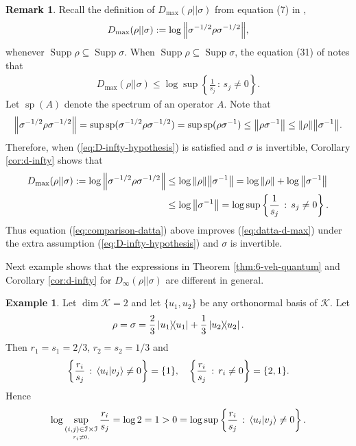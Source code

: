 \documentclass[12pt,a4paper,oneside]{article}
\numberwithin{equation}{section}
\theoremstyle{definition}  %
\newtheorem{eg}[defn]{Example}
\newtheorem{rmk}[defn]{Remark}
\theoremstyle{plain}  %
\theoremstyle{remark} %
\newcommand{\CK}{\mathcal{K}}
\DeclareMathOperator{\supp}{Supp}
\begin{document}
 \begin{rmk}\label{rmk:camparison-datta}Recall the definition of $D_{\operatorname{max}}(\rho||\sigma)$ from equation (7) in \cite{Datta2009},   \begin{align*}
     D_{\operatorname{max}}(\rho||\sigma):= \log \norm{\sigma^{-1/2}\rho\sigma^{-1/2}},
 \end{align*}
 whenever $\supp\rho \subseteq\supp \sigma$. When $\supp \rho \subseteq \supp \sigma$, the  equation (31) of \cite{Datta2009} notes that \begin{align}
     \label{eq:datta-d-max}
     D_{\operatorname{max}}(\rho||\sigma) \leq \log \sup\left\{\frac{1}{s_j}\,:\, s_j\neq 0\right\}.
 \end{align}
Let $\operatorname{sp}(A)$ denote the spectrum of an operator $A$.  Note that \[\norm{\sigma^{-1/2}\rho\sigma^{-1/2}}=\sup \operatorname{sp}(\sigma^{-1/2}\rho\sigma^{-1/2})=\sup \operatorname{sp}(\rho\sigma^{-1})\leq\norm{\rho\sigma^{-1}}\leq \norm{\rho} \norm{\sigma^{-1}}.\]
Therefore, when (\ref{eq:D-infty-hypothesis}) is satisfied and $\sigma$ is invertible, Corollary \ref{cor:d-infty} shows that \begin{align}\label{eq:comparison-datta}
     D_{\operatorname{max}}(\rho||\sigma):= \log \norm{\sigma^{-1/2}\rho\sigma^{-1/2}}&\leq \log \norm{\rho} \norm{\sigma^{-1}} = \log \norm{\rho}+\log \norm{\sigma^{-1}}\nonumber\\&\leq \log \norm{\sigma^{-1}}  = \log\sup\left\{\frac{1}{s_j}\,:\, s_j\neq 0\right\}.
\end{align} Thus equation (\ref{eq:comparison-datta}) above improves  (\ref{eq:datta-d-max}) under the extra assumption (\ref{eq:D-infty-hypothesis}) and $\sigma$ is invertible.
 \end{rmk}
 Next example shows that the expressions in Theorem \ref{thm:6-veh-quantum} and Corollary \ref{cor:d-infty} for $D_{\infty}(\rho||\sigma)$ are different in general.
 \begin{eg}
   Let $\dim \CK  = 2$ and let $\{u_1,u_2\}$ be any orthonormal basis of $\CK $. Let \begin{align*}
       \rho = \sigma =  \frac{2}{3}\ketbra{u_1}+\frac{1}{3}\ketbra{u_2}.
   \end{align*}  
   Then $r_1=s_1=2/3$, $r_2=s_2=1/3$ and \[\left\{\frac{r_i}{s_j}\,:\,\braket{u_i}{v_j}\neq 0\right\}  =\{1\}, \quad \left\{\frac{r_i}{s_j}\,:\, r_i\neq0\right\}= \{2,1\}. \]
 Hence \[\log \underset{\underset{r_i\neq0,}{(i,j)\in \mathcal{I}\times \mathcal{I}}}{\sup}\,\frac{r_i }{s_j}=\log 2=1 > 0 = \log \underset{}{\sup}\left\{\frac{r_i}{s_j}\,:\,\braket{u_i}{v_j}\neq 0\right\}.  \]
  \end{eg}
\end{document}
